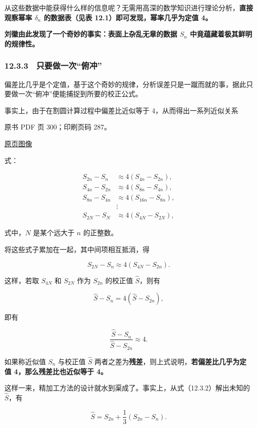 从这些数据中能获得什么样的信息呢？无需用高深的数学知识进行理论分析，\textbf{直接观察幂率 \(\delta_n\) 的数据表（见表 12.1）即可发现，幂率几乎为定值 4。}

\textbf{刘徽由此发现了一个奇妙的事实：表面上杂乱无章的数据 \(S_n\) 中竟蕴藏着极其鲜明的规律性。}

\subsubsection{12.3.3　只要做一次``俯冲''}\label{ch12-ux53eaux8981ux505aux4e00ux6b21ux4fefux51b2}

偏差比几乎是个定值，基于这个奇妙的规律，分析误差只是一蹴而就的事，据此只要做一次``俯冲''便能捕捉到所要的校正公式。

事实上，由于在割圆计算过程中偏差比近似等于 4，从而得出一系列近似关系

\clearpage

原书 PDF 页 300；印刷页码 287。

\href{source-images/pdf-300.jpeg}{原页图像}

式：

\[
\begin{aligned}
S_{2n}-S_n&\approx4(S_{4n}-S_{2n}),\\
S_{4n}-S_{2n}&\approx4(S_{8n}-S_{4n}),\\
S_{8n}-S_{4n}&\approx4(S_{16n}-S_{8n}),\\
&\vdots\\
S_{2N}-S_N&\approx4(S_{4N}-S_{2N}),
\end{aligned}
\]

式中，\(N\) 是某个远大于 \(n\) 的正整数。

将这些式子累加在一起，其中间项相互抵消，得

\[
S_{2N}-S_n\approx4(S_{4N}-S_{2n}).
\]

这样，若取 \(S_{4N}\) 和 \(S_{2N}\) 作为 \(S_{2n}\) 的校正值 \(\widehat S\)，则有

\[
\widehat S-S_n=4(\widehat S-S_{2n}),
\tag{12.3.2}
\]

即有

\[
\frac{\widehat S-S_n}{\widehat S-S_{2n}}\approx4.
\]

如果称近似值 \(S_n\) 与校正值 \(\widehat S\) 两者之差为\textbf{残差}，则上式说明，\textbf{若偏差比几乎为定值 4，那么残差比也近似等于 4。}

这样一来，精加工方法的设计就水到渠成了。事实上，从式（12.3.2）解出未知的 \(\widehat S\)，有

\[
\widehat S=S_{2n}+\frac{1}{3}(S_{2n}-S_n).
\tag{12.3.3}
\]

